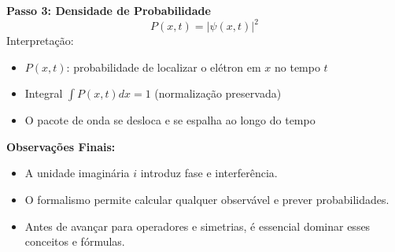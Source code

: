 \documentclass[a4paper,12pt]{article}
\begin{document}
\textbf{Passo 3: Densidade de Probabilidade}
\[
P(x,t) = |\psi(x,t)|^2
\]
Interpretação:
\begin{itemize}
    \item $P(x,t)$: probabilidade de localizar o elétron em $x$ no tempo $t$
    \item Integral $\int P(x,t) dx = 1$ (normalização preservada)
    \item O pacote de onda se desloca e se espalha ao longo do tempo
\end{itemize}

\textbf{Observações Finais:}
\begin{itemize}
    \item A unidade imaginária $i$ introduz fase e interferência.
    \item O formalismo permite calcular qualquer observável e prever probabilidades.
    \item Antes de avançar para operadores e simetrias, é essencial dominar esses conceitos e fórmulas.
\end{itemize}
\end{document}
